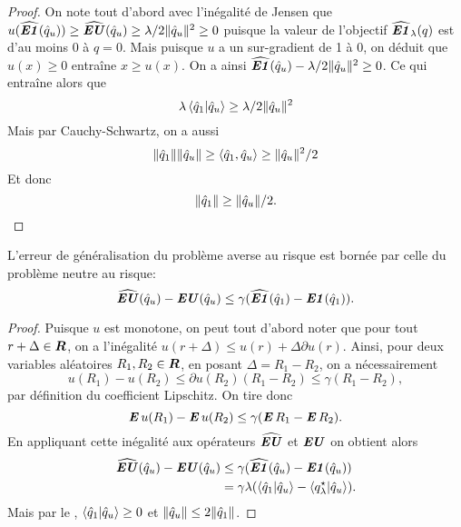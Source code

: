 \begin{proof}
  On note tout d'abord avec l'inégalité de Jensen que
  $u(\hEN(\qu)) \geq \hEU(\qu) \geq \lambda/2\|\qu\|^2 \geq 0$ puisque la valeur de l'objectif
  $\hEN_\lambda(q)$ est d'au moins 0 à $q=0$. Mais puisque $u$ a un sur-gradient de 1 à
  $0$, on déduit que $u(x) \geq 0$ entraîne $x \geq u(x)$. On a ainsi
  $\hEN(\qu) - \lambda/2\nq{\qu}^2 \geq 0$. Ce qui entraîne alors que
  \begin{equation}
    \lambda\braket{\qh_1|\qh_u} \geq \lambda/2\|\qh_u\|^2
  \end{equation}
  Mais par Cauchy-Schwartz, on a aussi
  \begin{equation}
    \|\qh_1\|\|\qh_u\| \geq \braket{\qh_1,\qh_u} \geq \|\qh_u\|^2/2
  \end{equation}
  Et donc
  \begin{equation}
    \|\qh_1\| \geq \|\qh_u\|/2.\qedhere
  \end{equation}
\end{proof}


\begin{lemme}
L'erreur de généralisation du problème averse au risque est bornée par celle du problème
neutre au risque:
\begin{equation}
  \hEU(\qu) - \EU(\qu) \leq \gamma(\hEN(\qn) - \EN(\qn)).
\end{equation}
\end{lemme}
\begin{proof}
  Puisque $u$ est monotone, on peut tout d'abord noter que pour tout $r+\Delta \in \R$, on a
  l'inégalité $u(r+\Delta) \leq u(r) + \Delta \partial u(r)$. Ainsi, pour deux variables aléatoires $R_1,R_2 \in
  \R$, en posant $\Delta = R_1-R_2$, on a nécessairement
  \begin{equation}
    u(R_1) - u(R_2) \leq \partial u(R_2) (R_1 -R_2) \leq \gamma(R_1 - R_2),
  \end{equation}
  par définition du coefficient Lipschitz. On tire donc
  \begin{equation}
    \E u(R_1) - \E u(R_2) \leq \gamma(\E R_1 - \E R_2). 
  \end{equation}
  En appliquant cette inégalité aux opérateurs $\hEU$ et $\EU$ on obtient alors
  \begin{align}
    \hEU(\qu) - \EU(\qu) &\leq \gamma(\hEN(\qu) - \EN(\qu))\\
                         &= \gamma\lambda(\braket{\qh_1|\qu} - \braket{\qsl|\qu}).
  \end{align}
  Mais par le , $\braket{\qh_1|\qu} \geq 0$ et $\|\qu\| \leq 2\|\qh_1\|$. 
\end{proof}



